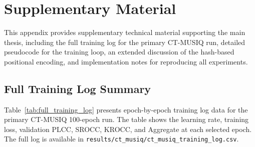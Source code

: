 
\chapter{Supplementary Material}
\label{app:supplementary}

This appendix provides supplementary technical material supporting the main thesis,
including the full training log for the primary CT-MUSIQ run, detailed pseudocode for
the training loop, an extended discussion of the hash-based positional encoding, and
implementation notes for reproducing all experiments.

\section{Full Training Log Summary}
\label{app:training_log}

Table~\ref{tab:full_training_log} presents epoch-by-epoch training log data for the
primary CT-MUSIQ 100-epoch run. The table shows the learning rate, training loss,
validation PLCC, SROCC, KROCC, and Aggregate at each selected epoch. The full log is
available in \texttt{results/ct\_musiq/ct\_musiq\_training\_log.csv}.

